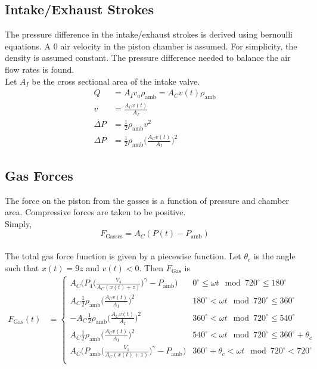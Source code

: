 \documentclass[10pt,a4paper]{article}
\begin{document}
\subsection*{Intake/Exhaust Strokes}
The pressure difference in the intake/exhaust strokes is derived using bernoulli equations. A 0 air velocity in the piston chamber is assumed. For simplicity, the density is assumed constant. The pressure difference needed to balance the air flow rates is found. \\ Let $A_I$ be the cross sectional area of the intake valve.
\begin{align}
	Q &= A_I v_a \rho_{\text{amb}} = A_C v(t)\rho_{\text{amb}}\\
	v &= \frac{A_C v(t)}{A_I}\\
	\Delta P &= \frac{1}{2} \rho_{\text{amb}} v^2 \\
	\Delta P &= \frac{1}{2} \rho_{\text{amb}} \Big( \frac{A_C v(t)}{A_I} \Big)^2
\end{align}
\subsection*{Gas Forces}
The force on the piston from the gasses is a function of pressure and chamber area. Compressive forces are taken to be positive. \\
 Simply, $$F_{\text{Gasses}} = A_C (P(t) - P_{\text{amb}})$$\\
 The total gas force function is given by a piecewise function. Let $\theta_c$ is the angle such that $x(t) = 9z$ and $v(t) < 0$. Then  $F_{\text{Gas}}$ is
\begin{align}
F_{\text{Gas}}(t) &=
\begin{cases}
A_C \Big(P_{4} \Big( \frac{V_4}{A_C (x(t)+z)} \Big)^{\gamma} - P_{\text{amb}}\Big)  & 0^\circ \leq \omega t \mod 720^\circ \leq 180^\circ \\
A_C \frac{1}{2} \rho_{\text{amb}} \Big( \frac{A_C v(t)}{A_I} \Big)^2  & 180^\circ < \omega t \mod 720^\circ \leq 360^\circ \\
- A_C \frac{1}{2} \rho_{\text{amb}} \Big( \frac{A_C v(t)}{A_I} \Big)^2  & 360^\circ < \omega t \mod 720^\circ \leq 540^\circ \\
A_C \frac{1}{2} \rho_{\text{amb}} \Big( \frac{A_C v(t)}{A_I} \Big)^2 & 540^\circ < \omega t \mod 720^\circ \leq 360^\circ + \theta_c \\
A_C \Big( P_{\text{amb}} \Big( \frac{V_1}{A_C (x(t)+z)} \Big)^{\gamma}- P_{\text{amb}}\Big)  & 360^\circ + \theta_c < \omega t \mod 720^\circ < 720^\circ \\
\end{cases}
\end{align}
\end{document}
